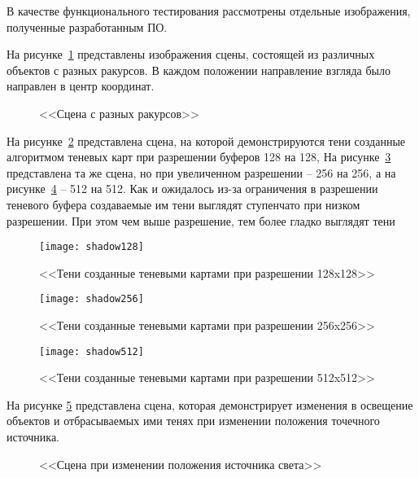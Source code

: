 В качестве функционального тестирования рассмотрены отдельные изображения, полученные разработанным ПО.

На рисунке~\ref{fig:racurs2} представлены изображения сцены, состоящей из различных объектов с разных ракурсов. В каждом положении направление взгляда было направлен в центр координат.

\begin{figure}[H]
	\centering
	\hfil
	\hfil
	\caption{<<Сцена с разных ракурсов>>}
	\label{fig:racurs2}
\end{figure}

На рисунке~\ref{fig:shadow128} представлена сцена, на которой демонстрируются тени созданные алгоритмом теневых карт при разрешении буферов 128 на 128, На рисунке~\ref{fig:shadow256} представлена  та же сцена, но при увеличенном разрешении -- 256  на 256, а на рисунке~\ref{fig:shadow512} -- 512 на 512.
Как и ожидалось из-за ограничения в разрешении теневого буфера создаваемые им тени выглядят ступенчато при низком разрешении. При этом чем выше разрешение, тем более гладко выглядят тени

\begin{figure}[H]
	\centering
	\texttt{[image: shadow128]}
	\caption{<<Тени созданные теневыми картами при разрешении 128x128>>}
	\label{fig:shadow128}
\end{figure}

\begin{figure}[H]
	\centering
	\texttt{[image: shadow256]}
	\caption{<<Тени созданные теневыми картами при разрешении 256x256>>}
	\label{fig:shadow256}
\end{figure}


\begin{figure}[H]
	\centering
	\texttt{[image: shadow512]}
	\caption{<<Тени созданные теневыми картами при разрешении 512x512>>}
	\label{fig:shadow512}
\end{figure}

На рисунке \ref{fig:light} представлена сцена, которая демонстрирует изменения в освещение объектов и отбрасываемых ими тенях при изменении положения точечного источника.

\begin{figure}[H]
	\centering
	\hfil
	\hfil
	\caption{<<Сцена при изменении положения источника света>>}
	\label{fig:light}
\end{figure}



